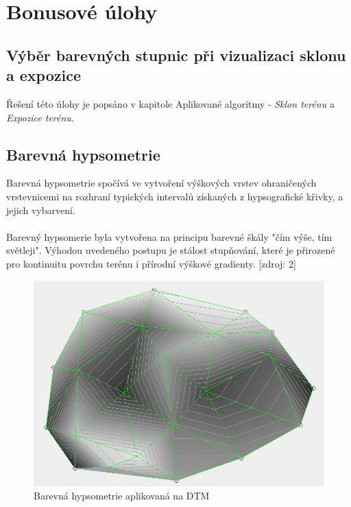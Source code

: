 \documentclass[a4paper, 12pt]{article}
\begin{document}
\newpage

\section{Bonusové úlohy}

\subsection{Výběr barevných stupnic při vizualizaci sklonu a expozice}
Řešení této úlohy je popsáno v kapitole Aplikované algoritmy - \textit{Sklon terénu} a \textit{Expozice terénu}.

\subsection{Barevná hypsometrie}

Barevná hypsometrie spočívá ve vytvoření výškových vrstev ohraničených vrstevnicemi na rozhraní typických intervalů získaných z hypsografické křivky, a jejich vybarvení.\\
\\
Barevný hypsomerie byla vytvořena na principu barevné škály "čím výše, tím světleji". Výhodou uvedeného postupu je stálost stupňování, které je přirozené pro kontinuitu povrchu terénu i přírodní výškové gradienty. [zdroj: 2]

\begin{figure}[h!]
	\centering
	\includegraphics[width=12cm]{hypso.jpg}
	\caption{Barevná hypsometrie aplikovaná na DTM}
\end{figure}

\newpage
\end{document}
